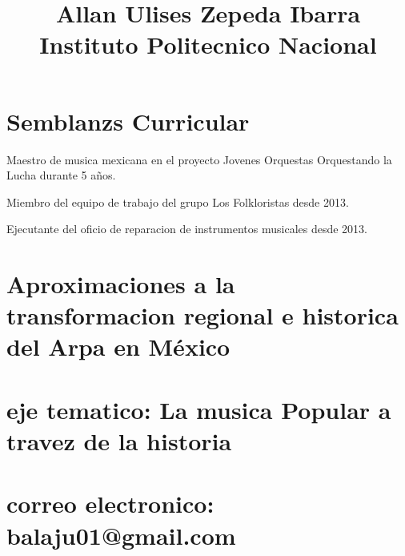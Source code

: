 \documentclass{article}
\begin{document}
\title{Allan Ulises Zepeda Ibarra Instituto Politecnico Nacional}

\section{Semblanzs Curricular}

Maestro de musica mexicana en el proyecto Jovenes Orquestas Orquestando la Lucha durante 5 años.

Miembro del equipo de trabajo del grupo Los Folkloristas desde 2013.

Ejecutante del oficio de reparacion de instrumentos musicales desde 2013.

\section{Aproximaciones a la transformacion regional e historica del Arpa en México}

\section{eje tematico: La musica Popular a travez de la historia}

\section{correo electronico: balaju01@gmail.com}


%
%
\end{document}
